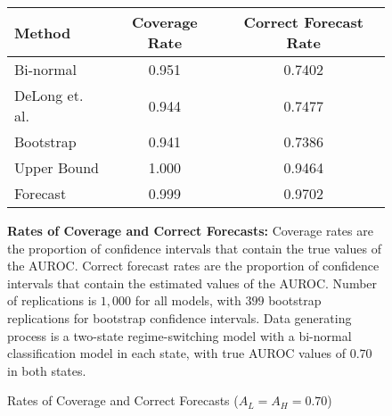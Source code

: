 


\begin{figure}[h!]

\begin{center}

    \caption{Rates of Coverage and Correct Forecasts ($A_L = A_H = 0.70$)} \label{fig:Coverage1}

    \begin{tabular}{l c c }

    Method & Coverage Rate & Correct Forecast Rate \\

    \hline
    
    
    
          Bi-normal  &  0.951 & 0.7402 \\
     DeLong et. al.  &  0.944 & 0.7477 \\
          Bootstrap  &  0.941 & 0.7386 \\
        Upper Bound  &  1.000 & 0.9464 \\
           Forecast  &  0.999 & 0.9702 \\

    \hline

    \end{tabular}


\end{center}

    \footnotesize

        \textbf{Rates of Coverage and Correct Forecasts:}
        Coverage rates are the proportion of confidence intervals that contain the true values of the AUROC.
        Correct forecast rates are the proportion of confidence intervals that contain the estimated values of the AUROC.
        Number of replications is $1,000$ for all models, with $399$ bootstrap replications for bootstrap confidence intervals.
        Data generating process is a two-state regime-switching model with a bi-normal classification model in each state,
        with true AUROC values of $0.70$ in both states.





\end{figure}



